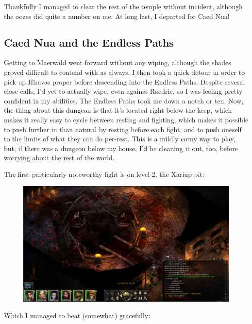 \documentclass{article}
\begin{document}
Thankfully I managed to clear the rest of the temple without incident, although the oozes did quite a number on me.  At long last, I departed for Caed Nua!

\subsection{Caed Nua and the Endless Paths}
Getting to Maerwald went forward without any wiping, although the shades proved difficult to contend with as always.  I then took a quick detour in order to pick up Hiravas proper before descending into the Endless Paths.  Despite several close calls, I'd yet to actually wipe, even against Raedric, so I was feeling pretty confident in my abilities.  The Endless Paths took me down a notch or ten.  Now, the thing about this dungeon is that it's located right below the keep, which makes it really easy to cycle between resting and fighting, which makes it possible to push further in than natural by resting before each fight, and to push oneself to the limits of what they can do per-rest.  This is a mildly corny way to play, but, if there was a dungeon below my house, I'd be cleaning it out, too, before worrying about the rest of the world.

The first particularly noteworthy fight is on level 2, the Xariup pit:

\begin{figure}
\includegraphics[scale=0.33]{files/blog/2018_06_16_pillars_of_eternity_path_of_the_damned_act_i/2018_06_16_l2_xariups_before.jpg}
\end{figure}

Which I managed to beat (somewhat) gracefully:
\end{document}
